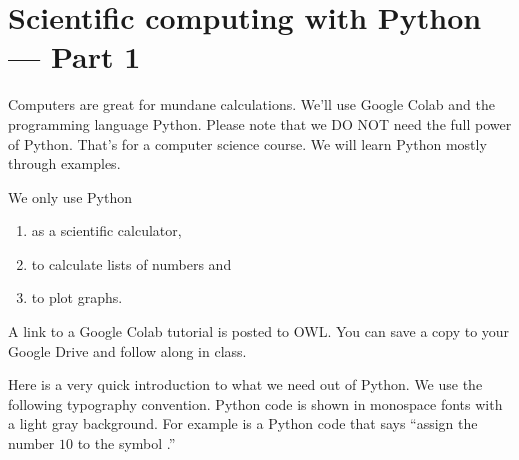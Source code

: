 \documentclass[../main.tex]{subfiles}
\begin{document}
 \section{Scientific computing with Python --- Part 1}

Computers are great for mundane calculations. We'll use Google Colab and the programming language Python. Please note that we DO NOT need the full power of Python. That's for a computer science course.  We will learn Python mostly through examples. 

We only use Python 
\begin{enumerate}
  \item as a scientific calculator,
  \item to calculate lists of numbers and
  \item to plot graphs.
\end{enumerate}

A link to a Google Colab tutorial is posted to OWL. You can save a copy to your Google Drive and follow along in class.

Here is a very quick introduction to what we need out of Python.  We use the following typography convention. Python code is shown in monospace fonts with a light gray background. For example  is a Python code that says ``assign the number \(10\) to the symbol .''
\end{document}
